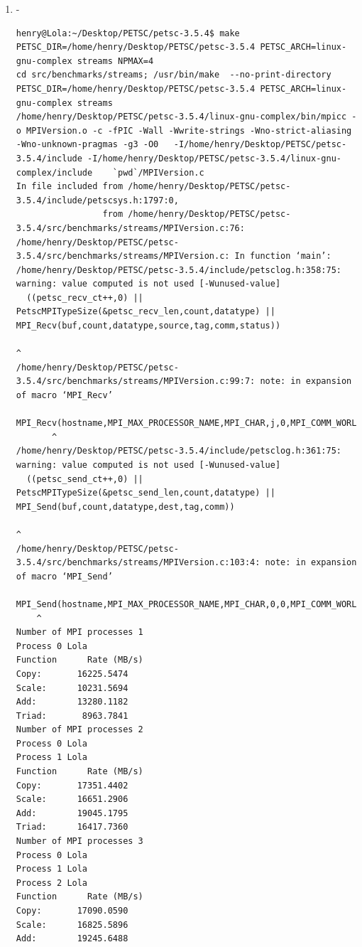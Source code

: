 \documentclass{article}
\begin{document}
\begin{enumerate}
\begin{verbatim}
\end{verbatim}
\normalsize
\item 
\tiny-
\begin{verbatim}
henry@Lola:~/Desktop/PETSC/petsc-3.5.4$ make PETSC_DIR=/home/henry/Desktop/PETSC/petsc-3.5.4 PETSC_ARCH=linux-gnu-complex streams NPMAX=4
cd src/benchmarks/streams; /usr/bin/make  --no-print-directory PETSC_DIR=/home/henry/Desktop/PETSC/petsc-3.5.4 PETSC_ARCH=linux-gnu-complex streams
/home/henry/Desktop/PETSC/petsc-3.5.4/linux-gnu-complex/bin/mpicc -o MPIVersion.o -c -fPIC -Wall -Wwrite-strings -Wno-strict-aliasing -Wno-unknown-pragmas -g3 -O0   -I/home/henry/Desktop/PETSC/petsc-3.5.4/include -I/home/henry/Desktop/PETSC/petsc-3.5.4/linux-gnu-complex/include    `pwd`/MPIVersion.c
In file included from /home/henry/Desktop/PETSC/petsc-3.5.4/include/petscsys.h:1797:0,
                 from /home/henry/Desktop/PETSC/petsc-3.5.4/src/benchmarks/streams/MPIVersion.c:76:
/home/henry/Desktop/PETSC/petsc-3.5.4/src/benchmarks/streams/MPIVersion.c: In function ‘main’:
/home/henry/Desktop/PETSC/petsc-3.5.4/include/petsclog.h:358:75: warning: value computed is not used [-Wunused-value]
  ((petsc_recv_ct++,0) || PetscMPITypeSize(&petsc_recv_len,count,datatype) || MPI_Recv(buf,count,datatype,source,tag,comm,status))
                                                                           ^
/home/henry/Desktop/PETSC/petsc-3.5.4/src/benchmarks/streams/MPIVersion.c:99:7: note: in expansion of macro ‘MPI_Recv’
       MPI_Recv(hostname,MPI_MAX_PROCESSOR_NAME,MPI_CHAR,j,0,MPI_COMM_WORLD,&status);
       ^
/home/henry/Desktop/PETSC/petsc-3.5.4/include/petsclog.h:361:75: warning: value computed is not used [-Wunused-value]
  ((petsc_send_ct++,0) || PetscMPITypeSize(&petsc_send_len,count,datatype) || MPI_Send(buf,count,datatype,dest,tag,comm))
                                                                           ^
/home/henry/Desktop/PETSC/petsc-3.5.4/src/benchmarks/streams/MPIVersion.c:103:4: note: in expansion of macro ‘MPI_Send’
    MPI_Send(hostname,MPI_MAX_PROCESSOR_NAME,MPI_CHAR,0,0,MPI_COMM_WORLD);
    ^
Number of MPI processes 1
Process 0 Lola
Function      Rate (MB/s) 
Copy:       16225.5474
Scale:      10231.5694
Add:        13280.1182
Triad:       8963.7841
Number of MPI processes 2
Process 0 Lola
Process 1 Lola
Function      Rate (MB/s) 
Copy:       17351.4402
Scale:      16651.2906
Add:        19045.1795
Triad:      16417.7360
Number of MPI processes 3
Process 0 Lola
Process 1 Lola
Process 2 Lola
Function      Rate (MB/s) 
Copy:       17090.0590
Scale:      16825.5896
Add:        19245.6488

\end{verbatim}
\end{enumerate}
\end{document}
